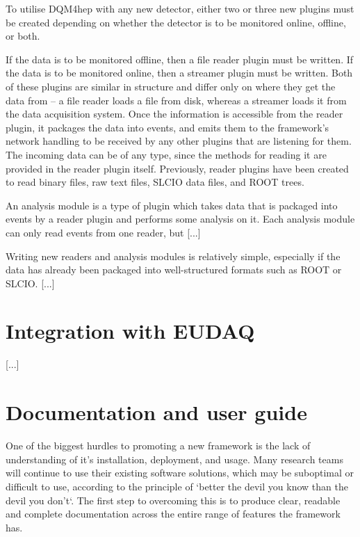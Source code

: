 To utilise DQM4hep with any new detector, either two or three new plugins must be created depending on whether the detector is to be monitored online, offline, or both.

If the data is to be monitored offline, then a file reader plugin must be written. If the data is to be monitored online, then a streamer plugin must be written. Both of these plugins are similar in structure and differ only on where they get the data from -- a file reader loads a file from disk, whereas a streamer loads it from the data acquisition system. Once the information is accessible from the reader plugin, it packages the data into events, and emits them to the framework's network handling to be received by any other plugins that are listening for them. The incoming data can be of any type, since the methods for reading it are provided in the reader plugin itself. Previously, reader plugins have been created to read binary files, raw text files, SLCIO data files, and ROOT trees.

An analysis module is a type of plugin which takes data that is packaged into events by a reader plugin and performs some analysis on it. Each analysis module can only read events from one reader, but [...] 

Writing new readers and analysis modules is relatively simple, especially if the data has already been packaged into well-structured formats such as ROOT or SLCIO. [...]


\section{Integration with EUDAQ}
[...]

\section{Documentation and user guide}

One of the biggest hurdles to promoting a new framework is the lack of understanding of it's installation, deployment, and usage. Many research teams will continue to use their existing software solutions, which may be suboptimal or difficult to use, according to the principle of `better the devil you know than the devil you don't`. The first step to overcoming this is to produce clear, readable and complete documentation across the entire range of features the framework has.

